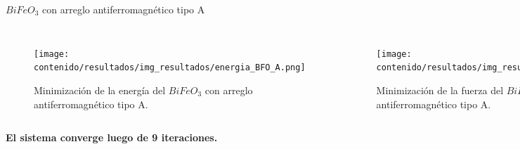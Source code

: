 \begin{frame}{$BiFeO_{3}$ con arreglo antiferromagn\'etico tipo A}
            \begin{columns}[t]
        \begin{figure}[H]
            \centering
            \texttt{[image: contenido/resultados/img\_resultados/energia\_BFO\_A.png]}
            \caption{Minimizaci\'on de la energ\'ia del $BiFeO_{3}$ con arreglo 
                antiferromagn\'etico tipo A.}
        \end{figure}
        \begin{figure}[H]
            \centering
            \texttt{[image: contenido/resultados/img\_resultados/fuerza\_BFO\_A.png]}
            \caption{Minimizaci\'on de la fuerza del $BiFeO_{3}$ con arreglo 
            antiferromagn\'etico tipo A.}
        \end{figure}
    \end{columns}
\centering
\textbf{El sistema converge luego de 9 iteraciones.}
\end{frame}


